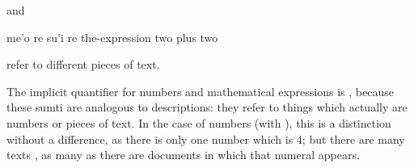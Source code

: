 {\noindent}and
\begin{example}
me'o re su'i re\n
the-expression two plus two\n
{}
\end{example}

{\noindent}refer to different pieces of text. 

The implicit quantifier for numbers and mathematical
    expressions is , because these sumti are analogous to
     descriptions: they refer to things which actually are
    numbers or pieces of text. In the case of numbers (with
    ), this is a distinction without a difference, as there
    is only one number which is 4; but there are many texts ,
    as many as there are documents in which that numeral
    appears.
